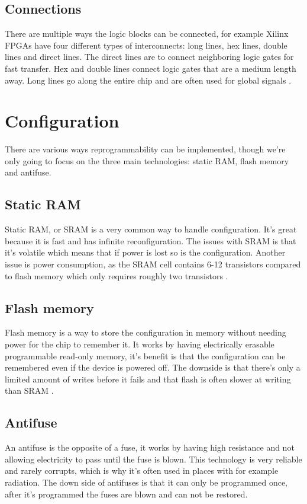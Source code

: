 \subsection{Connections}
There are multiple ways the logic blocks can be connected, for example Xilinx
FPGAs have four different types of interconnects: long lines, hex lines, double
lines and direct lines. The direct lines are to connect neighboring logic gates
for fast transfer. Hex and double lines connect logic gates that are a medium
length away. Long lines go along the entire chip and are often used for global
signals \citep{HideharuAmano8}.


\section{Configuration}
There are various ways reprogrammability can be implemented, though we're only
going to focus on the three main technologies: static RAM, flash memory and
antifuse.

\subsection{Static RAM}
Static RAM, or SRAM is a very common way to handle configuration. It's great
because it is fast and has infinite reconfiguration. The issues with SRAM is
that it's volatile which means that if power is lost so is the configuration.
Another issue is power consumption, as the SRAM cell contains 6-12 transistors
compared to flash memory which only requires roughly two transistors
\citep{HideharuAmano8}.

\subsection{Flash memory}
Flash memory is a way to store the configuration in memory without needing
power for the chip to remember it. It works by having electrically erasable
programmable read-only memory, it's benefit is that the configuration can be
remembered even if the device is powered off. The downside is that there's only
a limited amount of writes before it fails and that flash is often slower at
writing than SRAM \citep{M.MorrisMano3}.

\subsection{Antifuse}
An antifuse is the opposite of a fuse, it works by having high resistance and
not allowing electricity to pass until the fuse is blown. This technology is
very reliable and rarely corrupts, which is why it's often used in places with
for example radiation. The down side of antifuses is that it can only be
programmed once, after it's programmed the fuses are blown and can not be
restored.
